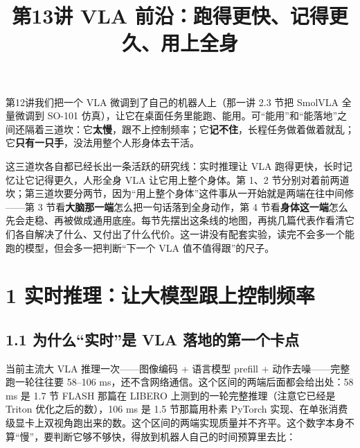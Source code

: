 \documentclass[
  chinese,
]{ctexart}
\title{第13讲 VLA 前沿：跑得更快、记得更久、用上全身}
\author{}
\date{}
\renewcommand*\contentsname{目录}
\newcommand\contentsname{目录}
\begin{document}
\maketitle

\renewcommand*\contentsname{目录}
{
\hypersetup{linkcolor=}
\setcounter{tocdepth}{3}
\tableofcontents
}

第12讲我们把一个 VLA 微调到了自己的机器人上（那一讲 2.3 节把 SmolVLA
全量微调到 SO-101
仿真），让它在桌面任务里能跑、能用。可``能用''和``能落地''之间还隔着三道坎：它\textbf{太慢}，跟不上控制频率；它\textbf{记不住}，长程任务做着做着就乱；它\textbf{只有一只手}，没法用整个人形身体去干活。

这三道坎各自都已经长出一条活跃的研究线：实时推理让 VLA
跑得更快，长时记忆让它记得更久，人形全身 VLA 让它用上整个身体。第 1、2
节分别对着前两道坎；第三道坎要分两节，因为``用上整个身体''这件事从一开始就是两端在往中间修------第
3 节看\textbf{大脑那一端}怎么把一句话落到全身动作，第 4
节看\textbf{身体这一端}怎么先会走稳、再被做成通用底座。每节先摆出这条线的地图，再挑几篇代表作看清它们各自解决了什么、又付出了什么代价。这一讲没有配套实验，读完不会多一个能跑的模型，但会多一把判断``下一个
VLA 值不值得跟''的尺子。

\section{1
实时推理：让大模型跟上控制频率}\label{ux5b9eux65f6ux63a8ux7406ux8ba9ux5927ux6a21ux578bux8ddfux4e0aux63a7ux5236ux9891ux7387}

\subsection{1.1 为什么``实时''是 VLA
落地的第一个卡点}\label{ux4e3aux4ec0ux4e48ux5b9eux65f6ux662f-vla-ux843dux5730ux7684ux7b2cux4e00ux4e2aux5361ux70b9}

当前主流大 VLA 推理一次------图像编码 + 语言模型 prefill +
动作去噪------完整跑一轮往往要 58--106
ms，还不含网络通信。这个区间的两端后面都会给出处：58 ms 是 1.7 节 FLASH
那篇在 LIBERO 上测到的一轮完整推理（注意它已经是 Triton
优化之后的数），106 ms 是 1.5 节那篇用朴素 PyTorch
实现、在单张消费级显卡上双视角跑出来的数。这个区间的两端实现质量并不齐平。这个数字本身不算``慢''，要判断它够不够快，得放到机器人自己的时间预算里去比：
\end{document}
